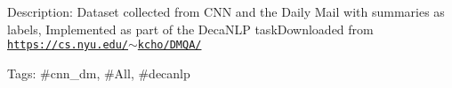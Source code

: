 Description\+: Dataset collected from C\+NN and the Daily Mail with summaries as labels, Implemented as part of the Deca\+N\+LP task\+Downloaded from \href{https://cs.nyu.edu/~kcho/DMQA/}{\tt https\+://cs.\+nyu.\+edu/$\sim$kcho/\+D\+M\+Q\+A/}

Tags\+: \#cnn\+\_\+dm, \#\+All, \#decanlp 